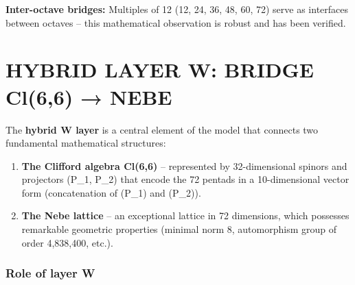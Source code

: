 \documentclass[11pt]{article}
\providecommand{\tightlist}{%
\setlength{\itemsep}{2pt}\setlength{\parskip}{6pt}
}
\begin{document}
\textbf{Inter-octave bridges:} Multiples of 12 (12, 24, 36, 48, 60, 72)
serve as interfaces between octaves -- this mathematical observation is
robust and has been verified.

\hypertarget{hybrid-layer-w-bridge-cl66-nebe}{%
\section{HYBRID LAYER W: BRIDGE Cl(6,6) →
NEBE}\label{hybrid-layer-w-bridge-cl66-nebe}}

The \textbf{hybrid W layer} is a central element of the model that
connects two fundamental mathematical structures:

\begin{enumerate}
\def\labelenumi{\arabic{enumi}.}
\tightlist
\item
  \textbf{The Clifford algebra Cl(6,6)} -- represented by 32-dimensional
  spinors and projectors (P\_1, P\_2) that encode the 72 pentads in a
  10-dimensional vector form (concatenation of (P\_1) and (P\_2)).
\item
  \textbf{The Nebe lattice} -- an exceptional lattice in 72 dimensions,
  which possesses remarkable geometric properties (minimal norm 8,
  automorphism group of order 4,838,400, etc.).
\end{enumerate}

\hypertarget{role-of-layer-w}{%
\subsubsection{Role of layer W}\label{role-of-layer-w}}
\end{document}
